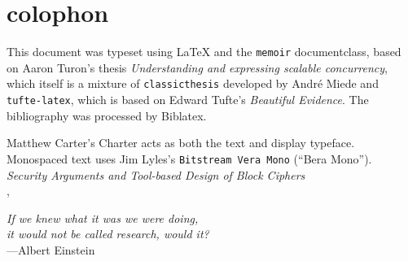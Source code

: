 \thispagestyle{empty}
\hphantom{.}
\vfill
\section*{colophon}

This document was typeset using \LaTeX{} and the \texttt{memoir} documentclass, based on Aaron Turon's thesis \emph{Understanding and expressing scalable concurrency}, which itself is a mixture of \texttt{classicthesis} developed by Andr\'e Miede and \texttt{tufte-latex}, which is based on Edward Tufte's \emph{Beautiful Evidence}.
The bibliography was processed by Biblatex.

Matthew Carter's \textrm{Charter} acts as both the text and display typeface.
Monospaced text uses Jim Lyles's \texttt{Bitstream Vera Mono} (\enquote{Bera Mono}).\\[2em]
\textit{Security Arguments and Tool-based Design of Block Ciphers}\\
\textcopyright{} \thedate{}, \theauthor{}
\clearpage{}

\thispagestyle{empty}
\vphantom{.}
\vfill
{%
    \flushright{}
    \emph{If we knew what it was we were doing,\\
          it would not be called research, would it?}\\
    \hfill---Albert Einstein
}
\vfill
\vfill

\clearpage{}
